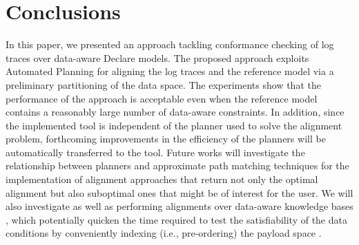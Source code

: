 \section{Conclusions}\label{sec:end}
In this paper, we presented an approach tackling conformance checking of log traces over data-aware Declare models. The proposed approach exploits Automated Planning for aligning the log traces and the reference model via a preliminary partitioning of the data space. The experiments show that the performance of the approach is acceptable even when the reference model contains a reasonably large number of data-aware constraints. In addition, since the implemented tool is independent of the planner used to solve the alignment problem, forthcoming improvements in the efficiency of the planners will be automatically transferred to the tool.
%
Future works will investigate the relationship between planners and approximate path matching techniques \cite{Myers1989} for the implementation of alignment approaches that return not only the optimal alignment but also suboptimal ones that might be of interest for the user. We will also investigate  as well as performing alignments over data-aware knowledge bases \cite{10.1007/978-3-319-39696-5_18}, which potentially quicken the time required to test the satisfiability of the data conditions by conveniently indexing (i.e., pre-ordering) the payload space \cite{IdreosGNMMK12}. 